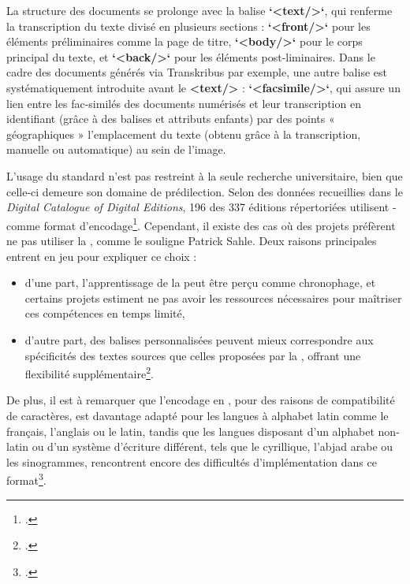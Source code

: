 La structure des documents \tei se prolonge avec la balise \textbf{`<text/>`}, qui renferme la transcription du texte divisé en plusieurs sections : \textbf{`<front/>`} pour les éléments préliminaires comme la page de titre, \textbf{`<body/>`} pour le corps principal du texte, et \textbf{`<back/>`} pour les éléments post-liminaires. 
Dans le cadre des documents générés via Transkribus par exemple, une autre balise est systématiquement introduite avant le \textbf{<text/>} : \textbf{`<facsimile/>`}, qui assure un lien entre les fac-similés des documents numérisés et leur transcription en identifiant (grâce à des balises et attributs enfants) par des points « géographiques » l’emplacement du texte (obtenu grâce à la transcription, manuelle ou automatique) au sein de l’image. 

L’usage du standard \tei n’est pas restreint à la seule recherche universitaire, bien que celle-ci demeure son domaine de prédilection. Selon des données recueillies dans le \textit{Digital Catalogue of Digital Editions}, 196 des 337 éditions répertoriées utilisent \xml-\tei comme format d’encodage\footcite{ucl_centre_for_digital_humanities_digital_nodate}. 
Cependant, il existe des cas où des projets préfèrent ne pas utiliser la \tei, comme le souligne Patrick Sahle. Deux raisons principales entrent en jeu pour expliquer ce choix : 
\begin{itemize}
    \item d’une part, l’apprentissage de la \tei peut être perçu comme chronophage, et certains projets estiment ne pas avoir les ressources nécessaires pour maîtriser ces compétences en temps limité, 
    \item d’autre part, des balises \xml personnalisées peuvent mieux correspondre aux spécificités des textes sources que celles proposées par la \tei, offrant une flexibilité supplémentaire\footcite[p.174-75]{sahle_what_2016}.
\end{itemize}
De plus, il est à remarquer que l’encodage en \tei, pour des raisons de compatibilité de caractères, est davantage adapté pour les langues à alphabet latin comme le français, l’anglais ou le latin, tandis que les langues disposant d’un alphabet non-latin ou d’un système d’écriture différent, tels que le cyrillique, l’abjad arabe ou les sinogrammes, rencontrent encore des difficultés d’implémentation dans ce format\footcite[p.177]{sahle_what_2016}.

